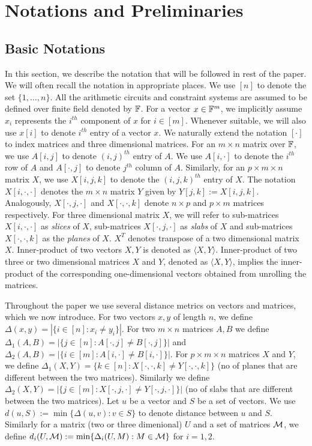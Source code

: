 \section{Notations and Preliminaries}\label{sec:prelims}
\subsection{Basic Notations}\label{sec:basicnotation}
In this section, we describe the notation that will be followed in rest of the
paper. We will often recall the notation in appropriate places. 
We use $[n]$ to
denote the set $\{1,\ldots,n\}$. All the arithmetic circuits and constraint
systems are assumed to be defined over finite field denoted by $\mathbb{F}$. For a
vector $x\in \mathbb{F}^m$, we implicitly assume $x_i$ represents the $i^{th}$
component of $x$ for $i\in [m]$. Whenever suitable, we will also use $x[i]$ to
denote $i^{th}$ entry of a vector $x$. We naturally extend the notation $[\cdot]$ to
index matrices and three dimensional matrices. For an $m\times n$ matrix over
$\mathbb{F}$, we use $A[i,j]$ to denote $(i,j)^{th}$ entry of $A$. We use $A[i,\cdot]$
to denote the $i^{th}$ row of $A$ and $A[\cdot,j]$ to denote $j^{th}$ column of
$A$. Similarly, for an $p\times m\times n$  matrix $X$, we use $X[i,j,k]$ to
denote the $(i,j,k)^{th}$ entry of $X$. The notation $X[i,\cdot,\cdot]$ denotes
the $m\times n$ matrix $Y$ given by $Y[j,k] := X[i,j,k]$. 
Analogously,
$X[\cdot,j,\cdot]$ and $X[\cdot,\cdot,k]$ denote $n\times p$ and $p\times m$
matrices respectively. For three dimensional
matrix $X$, we will refer to sub-matrices $X[i,\cdot,\cdot]$ as {\em slices} of
$X$, sub-matrices $X[\cdot,j,\cdot]$ as {\em slabs}  of $X$ and sub-matrices $X[\cdot,\cdot,k]$ as the {\em planes} of $X$. 
$X^T$ denotes transpose of a  two dimensional matrix $X$. Inner-product of two vectors $X,Y$ is denoted as $\langle X,Y\rangle$.
Inner-product of two three or two dimensional  matrices $X$ and $Y$, denoted as 
$\langle X,Y\rangle$,  implies the inner-product of the corresponding one-dimensional vectors obtained from unrolling  the matrices.


Throughout the paper we use several distance metrics on vectors and matrices,
which we now introduce. For two vectors $x,y$ of length $n$, we define
$\Delta(x,y)=|\{i\in [n]: x_i\neq y_i\}|$. For two $m\times n$ matrices $A,B$ we
define $\Delta_1(A,B)=|\{j\in [n]: A[\cdot,j]\neq B[\cdot,j]\}|$ and
$\Delta_2(A,B)=|\{i\in [m]: A[i,\cdot]\neq B[i,\cdot]\}|$. For $p\times m\times
n$ matrices $X$ and $Y$, we define $\Delta_1(X,Y)=\{k\in
[n]:X[\cdot,\cdot,k]\neq Y[\cdot,\cdot,k]\}$ (no of planes that are different between the two matrices). Similarly we define $\Delta_2(X,Y)
= |\{j\in [m]: X[\cdot,j,\cdot]\neq Y[\cdot,j,\cdot]\}|$  (no of slabs that are different between the two matrices). Let $u$ be a vector
and $S$ be a set of vectors. We use $d(u,S) := \min\{\Delta(u,v):v\in S\}$ to
denote distance between $u$ and $S$. Similarly for a matrix (two or three
dimenional) $U$ and a set of matrices $\mathcal{M}$, we define $d_i(U,\mathcal{M}) :=
\min\{\Delta_i(U,M): M\in \mathcal{M}\}$ for $i=1,2$.

